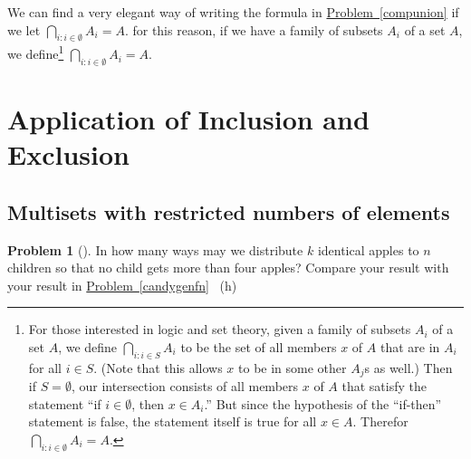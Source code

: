 \documentclass[10pt,]{book}
\theoremstyle{plain}
\theoremstyle{definition}
\newtheorem{activity}[project]{Problem}
\theoremstyle{definition}
\numberwithin{equation}{chapter}
\begin{document}
\hypertarget{p-1369}{}%
We can find a very elegant way of writing the formula in \hyperref[compunion]{Problem~\ref{compunion}} if we let \(\bigcap_{i:i\in\emptyset}A_i = A\).  for this reason, if we have a family of subsets \(A_i\) of a set \(A\), we define\footnote{For those interested in logic and set theory, given a family of subsets \(A_i\) of a set \(A\), we define \(\bigcap_{i:i\in S}A_i\) to be the set of all members \(x\) of \(A\) that are in \(A_i\) for all \(i \in S\).  (Note that this allows \(x\) to be in some other \(A_j\)s as well.)  Then if \(S = \emptyset\), our intersection consists of all members \(x\) of \(A\) that satisfy the statement ``if \(i\in \emptyset\), then \(x \in A_i\).'' But since the hypothesis of the ``if-then'' statement is false, the statement itself is true for all \(x \in A\).  Therefor \(\bigcap_{i:i \in \emptyset}A_i = A\).\label{fn-16}} \(\bigcap_{i:i\in\emptyset}A_i = A\).%
\typeout{************************************************}
\typeout{************************************************}
\section[{Application of Inclusion and Exclusion}]{Application of Inclusion and Exclusion}\label{sec_inclexcl-apps}
\typeout{************************************************}
\typeout{************************************************}
\subsection[{Multisets with restricted numbers of elements}]{Multisets with restricted numbers of elements}\label{subsection-54}
\begin{activity}[]\marginsymbol[-1em]{} \label{activity-235}
\hypertarget{p-1370}{}%
In how many ways may we distribute \(k\) identical apples to \(n\) children so that no child gets more than four apples? Compare your result with your result in \hyperref[candygenfn]{Problem~\ref{candygenfn}}%
~{\tiny (h)}\end{activity}
\typeout{************************************************}
\typeout{************************************************}
\end{document}
